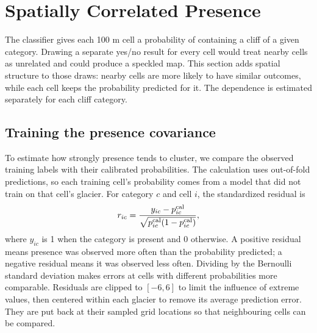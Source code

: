 \documentclass[11pt,a4paper]{article}
\begin{document}
\section{Spatially Correlated Presence}
The classifier gives each 100 m cell a probability of containing a cliff of a
given category. Drawing a separate yes/no result for every cell would treat
nearby cells as unrelated and could produce a speckled map. This section adds
spatial structure to those draws: nearby cells are more likely to have similar
outcomes, while each cell keeps the probability predicted for it. The
dependence is estimated separately for each cliff category.

\subsection{Training the presence covariance}
To estimate how strongly presence tends to cluster, we compare the observed
training labels with their calibrated probabilities. The calculation uses
out-of-fold predictions, so each training cell's probability comes from a
model that did not train on that cell's glacier. For category $c$ and cell $i$,
the standardized residual is
\[
 r_{ic}=\frac{y_{ic}-p_{ic}^{\rm cal}}
 {\sqrt{p_{ic}^{\rm cal}(1-p_{ic}^{\rm cal})}},
\]
where $y_{ic}$ is 1 when the category is present and 0 otherwise. A positive
residual means presence was observed more often than the probability predicted;
a negative residual means it was observed less often. Dividing by the
Bernoulli standard deviation makes errors at cells with different probabilities
more comparable. Residuals are clipped to $[-6,6]$ to limit the influence of
extreme values, then centered within each glacier to remove its average
prediction error. They are put back at their sampled grid locations so that
neighbouring cells can be compared.
\end{document}
